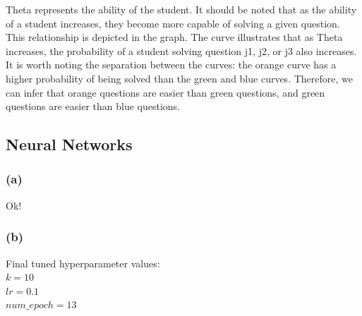 \documentclass{article}
\begin{document}
\noindent Theta represents the ability of the student. It should be noted that as the ability of a student increases, they become more capable of solving a given question. This relationship is depicted in the graph. The curve illustrates that as Theta increases, the probability of a student solving question j1, j2, or j3 also increases. It is worth noting the separation between the curves: the orange curve has a higher probability of being solved than the green and blue curves. Therefore, we can infer that orange questions are easier than green questions, and green questions are easier than blue questions.\\


\newpage

\subsection{Neural Networks}
\subsubsection{(a)}
Ok!
\subsubsection{(b)}
Final tuned hyperparameter values:\\
$k = 10$\\
$lr = 0.1$\\
$num\_epoch = 13$
\end{document}
